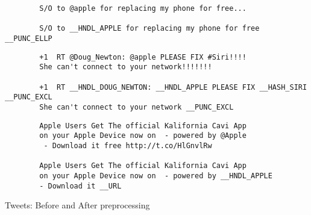 
\begin{table}[h]
\centering
		\begin{verbatim}
		S/O to @apple for replacing my phone for free...

		S/O to __HNDL_APPLE for replacing my phone for free __PUNC_ELLP
		\end{verbatim}
		\begin{verbatim}
		+1  RT @Doug_Newton: @apple PLEASE FIX #Siri!!!! 
		She can't connect to your network!!!!!!!

		+1  RT __HNDL_DOUG_NEWTON: __HNDL_APPLE PLEASE FIX __HASH_SIRI __PUNC_EXCL
		She can't connect to your network __PUNC_EXCL 
		\end{verbatim}
		\begin{verbatim}
		Apple Users Get The official Kalifornia Cavi App 
		on your Apple Device now on  - powered by @Apple
		 - Download it free http://t.co/HlGnvlRw

		Apple Users Get The official Kalifornia Cavi App 
		on your Apple Device now on  - powered by __HNDL_APPLE 
		- Download it __URL
		\end{verbatim}
\caption{Tweets: Before and After preprocessing}
\label{table:preproc}
\end{table}